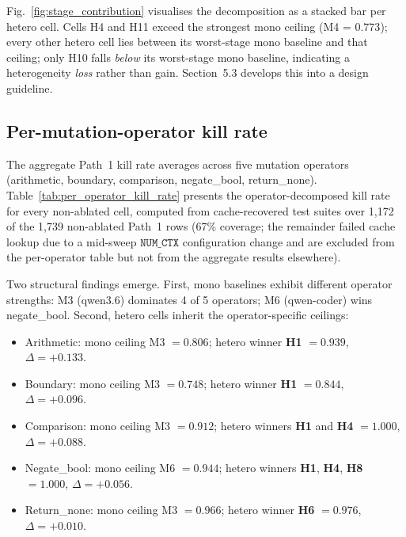 Fig.~\ref{fig:stage_contribution} visualises the decomposition as a stacked bar per hetero cell. Cells H4 and H11 exceed the strongest mono ceiling (M4 = $0.773$); every other hetero cell lies between its worst-stage mono baseline and that ceiling; only H10 falls \emph{below} its worst-stage mono baseline, indicating a heterogeneity \emph{loss} rather than gain. Section~5.3 develops this into a design guideline.

\subsection{Per-mutation-operator kill rate}

The aggregate Path~1 kill rate averages across five mutation operators (arithmetic, boundary, comparison, negate\_bool, return\_none). Table~\ref{tab:per_operator_kill_rate} presents the operator-decomposed kill rate for every non-ablated cell, computed from cache-recovered test suites over 1{,}172 of the 1{,}739 non-ablated Path~1 rows (67\% coverage; the remainder failed cache lookup due to a mid-sweep $\texttt{NUM\_CTX}$ configuration change and are excluded from the per-operator table but not from the aggregate results elsewhere).



Two structural findings emerge. First, mono baselines exhibit different operator strengths: M3 (qwen3.6) dominates 4 of 5 operators; M6 (qwen-coder) wins negate\_bool. Second, hetero cells inherit the operator-specific ceilings:

\begin{itemize}
  \item Arithmetic: mono ceiling M3 $= 0.806$; hetero winner \textbf{H1} $= 0.939$, $\Delta = +0.133$.
  \item Boundary: mono ceiling M3 $= 0.748$; hetero winner \textbf{H1} $= 0.844$, $\Delta = +0.096$.
  \item Comparison: mono ceiling M3 $= 0.912$; hetero winners \textbf{H1} and \textbf{H4} $= 1.000$, $\Delta = +0.088$.
  \item Negate\_bool: mono ceiling M6 $= 0.944$; hetero winners \textbf{H1}, \textbf{H4}, \textbf{H8} $= 1.000$, $\Delta = +0.056$.
  \item Return\_none: mono ceiling M3 $= 0.966$; hetero winner \textbf{H6} $= 0.976$, $\Delta = +0.010$.
\end{itemize}



